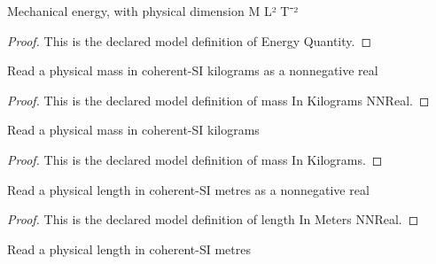 \begin{definition}
  \label{def:physics:phyx-mini-0789:phyxminiproblems-problemphyxmini0789-energyquantity}
  Mechanical energy, with physical dimension M L² T⁻²
\end{definition}
\begin{proof}
  This is the declared model definition of Energy Quantity.
\end{proof}
\begin{definition}
  \label{def:physics:phyx-mini-0789:phyxminiproblems-problemphyxmini0789-massinkilogramsnnreal}
  Read a physical mass in coherent-SI kilograms as a nonnegative real
\end{definition}
\begin{proof}
  This is the declared model definition of mass In Kilograms NNReal.
\end{proof}
\begin{definition}
  \label{def:physics:phyx-mini-0789:phyxminiproblems-problemphyxmini0789-massinkilograms}
  Read a physical mass in coherent-SI kilograms
\end{definition}
\begin{proof}
  This is the declared model definition of mass In Kilograms.
\end{proof}
\begin{definition}
  \label{def:physics:phyx-mini-0789:phyxminiproblems-problemphyxmini0789-lengthinmetersnnreal}
  Read a physical length in coherent-SI metres as a nonnegative real
\end{definition}
\begin{proof}
  This is the declared model definition of length In Meters NNReal.
\end{proof}
\begin{definition}
  \label{def:physics:phyx-mini-0789:phyxminiproblems-problemphyxmini0789-lengthinmeters}
  Read a physical length in coherent-SI metres
\end{definition}
